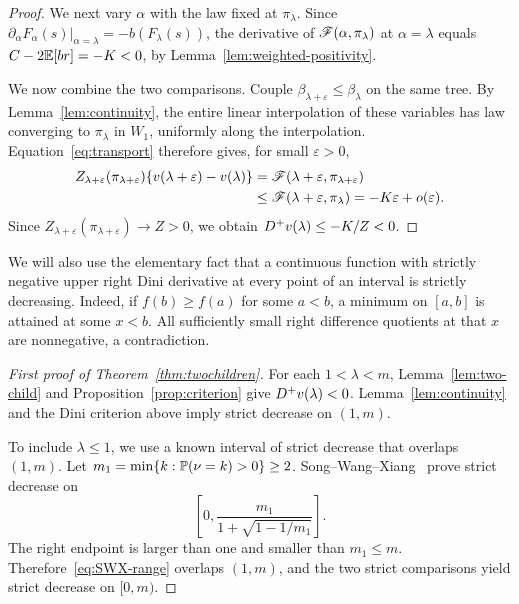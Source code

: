\begin{proof}
We next vary $\alpha$ with the law fixed at $\pi_\lambda$. Since $\partial_\alpha F_\alpha(s)|_{\alpha=\lambda}=-b(F_\lambda(s))$, the derivative of $\mathscr F(\alpha,\pi_\lambda)$ at $\alpha=\lambda$ equals $C-2\mathbb E[br]=-K<0$, by Lemma~\ref{lem:weighted-positivity}.

We now combine the two comparisons. Couple $\beta_{\lambda+\varepsilon}\le\beta_\lambda$ on the same tree. By Lemma~\ref{lem:continuity}, the entire linear interpolation of these variables has law converging to $\pi_\lambda$ in $W_1$, uniformly along the interpolation. Equation~\eqref{eq:transport} therefore gives, for small $\varepsilon>0$,
\begin{align*}
 Z_{\lambda+\varepsilon}(\pi_{\lambda+\varepsilon})
 \{v(\lambda+\varepsilon)-v(\lambda)\}
 &=\mathscr F(\lambda+\varepsilon,\pi_{\lambda+\varepsilon})\\
 &\le\mathscr F(\lambda+\varepsilon,\pi_\lambda)
 =-K\varepsilon+o(\varepsilon).
\end{align*}
Since $Z_{\lambda+\varepsilon}(\pi_{\lambda+\varepsilon})\to Z>0$, we obtain $D^{+} v(\lambda)\le-K/Z<0$.
\end{proof}

We will also use the elementary fact that a continuous function with strictly negative upper right Dini derivative at every point of an interval is strictly decreasing. Indeed, if $f(b)\ge f(a)$ for some $a<b$, a minimum on $[a,b]$ is attained at some $x<b$. All sufficiently small right difference quotients at that $x$ are nonnegative, a contradiction.

\begin{proof}[First proof of Theorem~\ref{thm:twochildren}]
For each $1<\lambda<m$, Lemma~\ref{lem:two-child} and Proposition~\ref{prop:criterion} give $D^{+} v(\lambda)<0$. Lemma~\ref{lem:continuity} and the Dini criterion above imply strict decrease on $(1,m)$.

To include $\lambda\le1$, we use a known interval of strict decrease that overlaps $(1,m)$. Let $m_1=\min\{k:\mathbb P(\nu=k)>0\}\ge2$. Song--Wang--Xiang~\cite[Theorem~1.2 and Lemma~2.5]{SWX} prove strict decrease on
\begin{equation}\label{eq:SWX-range}
 \left[0,\frac{m_1}{1+\sqrt{1-1/m_1}}\right].
\end{equation}
The right endpoint is larger than one and smaller than $m_1\le m$. Therefore~\eqref{eq:SWX-range} overlaps $(1,m)$, and the two strict comparisons yield strict decrease on $[0,m)$.
\end{proof}

